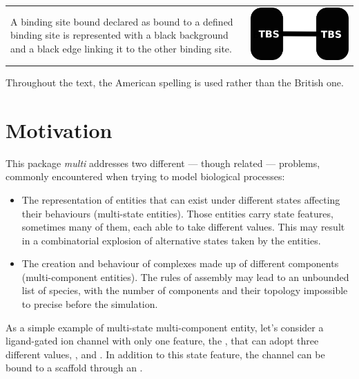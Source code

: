 \begin{tabular}{m{} m{}}
 A binding site bound declared as bound to a defined binding site is represented with a black background and a black edge linking it to the other binding site. &  \includegraphics{figs/pngs/specific.png} \\
\end{tabular}

Throughout the text, the American spelling is used rather than the British one.

\section{Motivation}

This package \emph{multi} addresses two different --- though related --- problems, commonly encountered when trying to model biological processes:

\begin{itemize}
 \item The representation of entities that can exist under different states affecting their behaviours (multi-state entities). Those entities carry state features, sometimes many of them, each able to take different values. This  may result in a combinatorial explosion of alternative states taken by the entities.
\item The creation and behaviour of complexes made up of different components (multi-component entities). The rules of assembly may lead to an unbounded list of species, with the number of components and their topology impossible to precise before the simulation. 
\end{itemize}

As a simple example of multi-state multi-component entity, let's consider a ligand-gated ion channel with only one feature, the , that can adopt three different values, ,  and . In addition to this state feature, the channel can be bound to a scaffold through an . 

